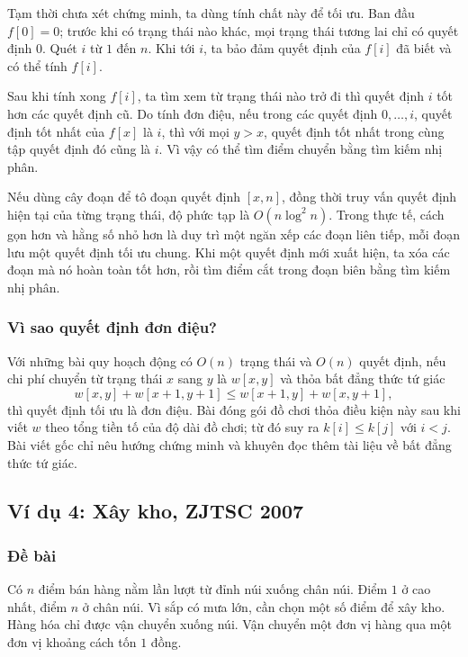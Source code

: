 \documentclass[11pt]{article}
\begin{document}
Tạm thời chưa xét chứng minh, ta dùng tính chất này để tối ưu. Ban đầu
$f[0]=0$; trước khi có trạng thái nào khác, mọi trạng thái tương lai chỉ có
quyết định $0$. Quét $i$ từ $1$ đến $n$. Khi tới $i$, ta bảo đảm quyết định
của $f[i]$ đã biết và có thể tính $f[i]$.

Sau khi tính xong $f[i]$, ta tìm xem từ trạng thái nào trở đi thì quyết định
$i$ tốt hơn các quyết định cũ. Do tính đơn điệu, nếu trong các quyết định
$0,\ldots,i$, quyết định tốt nhất của $f[x]$ là $i$, thì với mọi $y>x$,
quyết định tốt nhất trong cùng tập quyết định đó cũng là $i$. Vì vậy có thể
tìm điểm chuyển bằng tìm kiếm nhị phân.

Nếu dùng cây đoạn để tô đoạn quyết định $[x,n]$, đồng thời truy vấn quyết
định hiện tại của từng trạng thái, độ phức tạp là $O(n\log^2 n)$. Trong thực
tế, cách gọn hơn và hằng số nhỏ hơn là duy trì một ngăn xếp các đoạn liên
tiếp, mỗi đoạn lưu một quyết định tối ưu chung. Khi một quyết định mới xuất
hiện, ta xóa các đoạn mà nó hoàn toàn tốt hơn, rồi tìm điểm cắt trong đoạn
biên bằng tìm kiếm nhị phân.

\subsubsection*{Vì sao quyết định đơn điệu?}

Với những bài quy hoạch động có $O(n)$ trạng thái và $O(n)$ quyết định, nếu
chi phí chuyển từ trạng thái $x$ sang $y$ là $w[x,y]$ và thỏa bất đẳng thức
tứ giác
\[
  w[x,y]+w[x+1,y+1]\le w[x+1,y]+w[x,y+1],
\]
thì quyết định tối ưu là đơn điệu. Bài đóng gói đồ chơi thỏa điều kiện này
sau khi viết $w$ theo tổng tiền tố của độ dài đồ chơi; từ đó suy ra
$k[i]\le k[j]$ với $i<j$. Bài viết gốc chỉ nêu hướng chứng minh và khuyên
đọc thêm tài liệu về bất đẳng thức tứ giác.

\subsection{Ví dụ 4: Xây kho, ZJTSC 2007}

\subsubsection*{Đề bài}

Có $n$ điểm bán hàng nằm lần lượt từ đỉnh núi xuống chân núi. Điểm $1$ ở cao
nhất, điểm $n$ ở chân núi. Vì sắp có mưa lớn, cần chọn một số điểm để xây
kho. Hàng hóa chỉ được vận chuyển xuống núi. Vận chuyển một đơn vị hàng qua
một đơn vị khoảng cách tốn $1$ đồng.
\end{document}
